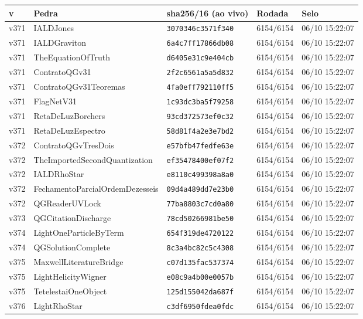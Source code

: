 \documentclass[11pt]{article}
\theoremstyle{definition}\newtheorem{deriv}{Derivação}
\begin{document}
{\small\begin{longtable}{@{}lllll@{}}\toprule v & Pedra & sha256/16 (ao vivo) & Rodada & Selo \\ \midrule\endhead 
v371 & IALDJones & \texttt{3070346c3571f340} & 6154/6154 & 06/10 15:22:07 \\
v371 & IALDGraviton & \texttt{6a4c7ff17866db08} & 6154/6154 & 06/10 15:22:07 \\
v371 & TheEquationOfTruth & \texttt{d6405e31c9e404cb} & 6154/6154 & 06/10 15:22:07 \\
v371 & ContratoQGv31 & \texttt{2f2c6561a5a5d832} & 6154/6154 & 06/10 15:22:07 \\
v371 & ContratoQGv31Teoremas & \texttt{4fa0eff792110ff5} & 6154/6154 & 06/10 15:22:07 \\
v371 & FlagNetV31 & \texttt{1c93dc3ba5f79258} & 6154/6154 & 06/10 15:22:07 \\
v371 & RetaDeLuzBorchers & \texttt{93cd372573ef0c32} & 6154/6154 & 06/10 15:22:07 \\
v371 & RetaDeLuzEspectro & \texttt{58d81f4a2e3e7bd2} & 6154/6154 & 06/10 15:22:07 \\
v372 & ContratoQGvTresDois & \texttt{e57bfb47fedfe63e} & 6154/6154 & 06/10 15:22:07 \\
v372 & TheImportedSecondQuantization & \texttt{ef35478400ef07f2} & 6154/6154 & 06/10 15:22:07 \\
v372 & IALDRhoStar & \texttt{e8110c499398a8a0} & 6154/6154 & 06/10 15:22:07 \\
v372 & FechamentoParcialOrdemDezesseis & \texttt{09d4a489dd7e23b0} & 6154/6154 & 06/10 15:22:07 \\
v372 & QGReaderUVLock & \texttt{77ba8803c7cd0a80} & 6154/6154 & 06/10 15:22:07 \\
v373 & QGCitationDischarge & \texttt{78cd50266981be50} & 6154/6154 & 06/10 15:22:07 \\
v374 & LightOneParticleByTerm & \texttt{654f319de4720122} & 6154/6154 & 06/10 15:22:07 \\
v374 & QGSolutionComplete & \texttt{8c3a4bc82c5c4308} & 6154/6154 & 06/10 15:22:07 \\
v375 & MaxwellLiteratureBridge & \texttt{c07d135fac537374} & 6154/6154 & 06/10 15:22:07 \\
v375 & LightHelicityWigner & \texttt{e08c9a4b00e0057b} & 6154/6154 & 06/10 15:22:07 \\
v375 & TetelestaiOneObject & \texttt{125d155042da687f} & 6154/6154 & 06/10 15:22:07 \\
v376 & LightRhoStar & \texttt{c3df6950fdea0fdc} & 6154/6154 & 06/10 15:22:07 \\

\end{longtable}}
\end{document}

